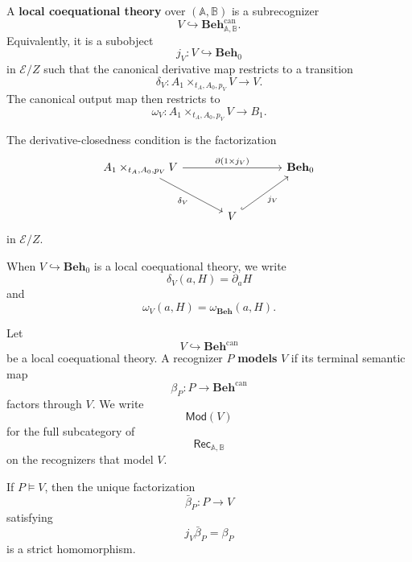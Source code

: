 \begin{definition}
\label{def:local-coequational-theory}
    A \textbf{local coequational theory} over \((\mathbb A,\mathbb B)\) is a
    subrecognizer
    \[
        V\hookrightarrow \mathbf{Beh}^{\mathrm{can}}_{\mathbb A,\mathbb B}.
    \]
    Equivalently, it is a subobject
    \[
        j_V:V\hookrightarrow\mathbf{Beh}_0
    \]
    in \(\mathcal E/Z\) such that the canonical derivative map restricts to a
    transition
    \[
        \delta_V:
        A_1\times_{t_A,A_0,p_V}V\to V.
    \]
    The canonical output map then restricts to
    \[
        \omega_V:
        A_1\times_{t_A,A_0,p_V}V\to B_1.
    \]
\end{definition}

The derivative-closedness condition is the factorization
\[
\begin{tikzcd}[column sep=large, row sep=large]
    A_1\times_{t_A,A_0,p_V}V
        \arrow[rr, "{\partial(1\times j_V)}"]
        \arrow[dr, "\delta_V"']
    &&
    \mathbf{Beh}_0
    \\
    &
    V
        \arrow[ur, hook, "j_V"']
    &
\end{tikzcd}
\]
in \(\mathcal E/Z\).

When \(V\hookrightarrow\mathbf{Beh}_0\) is a local coequational theory, we
write
\[
    \delta_V(a,H)=\partial_aH
\]
and
\[
    \omega_V(a,H)=\omega_{\mathbf{Beh}}(a,H).
\]

\begin{definition}[Models]
\label{def:models-coequational-theory}
    Let
    \[
        V\hookrightarrow\mathbf{Beh}^{\mathrm{can}}
    \]
    be a local coequational theory. A recognizer \(P\) \textbf{models} \(V\) if
    its terminal semantic map
    \[
        \beta_P:P\to\mathbf{Beh}^{\mathrm{can}}
    \]
    factors through \(V\). We write
    \[
        \mathsf{Mod}(V)
    \]
    for the full subcategory of
    \[
        \mathsf{Rec}_{\mathbb A,\mathbb B}
    \]
    on the recognizers that model \(V\).
\end{definition}

\begin{lemma}
\label{lem:model-factorizations-strict}
    If \(P\models V\), then the unique factorization
    \[
        \bar\beta_P:P\to V
    \]
    satisfying
    \[
        j_V\bar\beta_P=\beta_P
    \]
    is a strict homomorphism.
\end{lemma}


